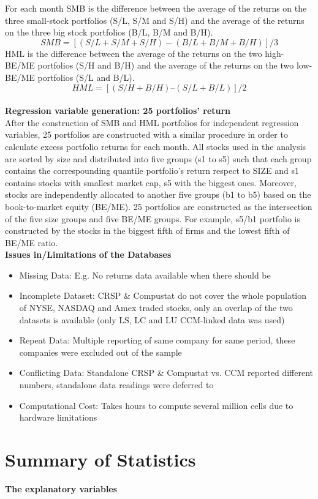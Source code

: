 \documentclass[12pt]{article}
\begin{document}
\noindent For each month SMB is the difference between the average of the returns on the three small-stock portfolios (S/L, S/M and S/H) and the average of the returns on the three big stock portfolios (B/L, B/M and B/H).
$$
SMB=[(S/L+S/M+S/H)-(B/L+B/M+B/H)]/3
$$
HML is the difference between the average of the returns on the two high-BE/ME portfolios (S/H and B/H) and the average of the returns on the two low-BE/ME portfolios (S/L and B/L).
$$
HML = [(S/H+B/H)–(S/L+B/L)]/2
$$
\noindent \\ \textbf{Regression variable generation: 25 portfolios' return}\\
After the construction of SMB and HML portfolios for independent regression variables, 25 portfolios are constructed with a similar procedure in order to calculate excess portfolio returns for each month. All  stocks used in the analysis are sorted by size and distributed into five groups (s1 to s5) such that each group contains the correspounding quantile portfolio's return respect to SIZE and s1 contains stocks with smallest market cap, s5 with the biggest ones. Moreover, stocks are independently allocated to another five groups (b1 to b5) based on the book-to-market equity (BE/ME). 25 portfolios are constructed as the intersection of the five size groups and five BE/ME groups. For example, s5/b1 portfolio is constructed by the stocks in the biggest fifth of firms and the lowest fifth of BE/ME ratio.\\ 

\noindent \textbf{Issues in/Limitations of the Databases}
\begin{itemize}
	\item Missing Data: E.g. No returns data available when there should be
	\item Incomplete Dataset: CRSP \& Compustat do not cover the whole population of NYSE, NASDAQ and Amex traded stocks, only an overlap of the two datasets is available (only LS, LC and LU CCM-linked data was used)
	\item Repeat Data: Multiple reporting of same company for same period, these companies were excluded out of the sample
	\item Conflicting Data: Standalone CRSP \& Compustat vs. CCM reported different numbers, standalone data readings were deferred to
	\item Computational Cost: Takes hours to compute several million cells due to hardware limitations
\end{itemize}
\section{Summary of Statistics}
\textbf{The explanatory variables}
\end{document}
